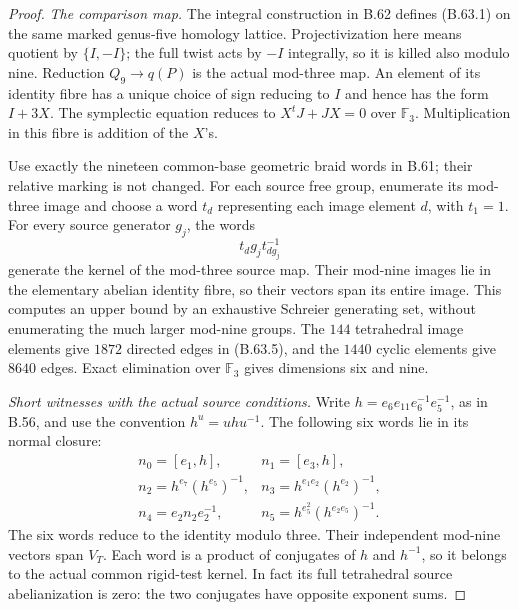 \begin{proof}
\emph{The comparison map.}
The integral construction in B.62 defines (B.63.1) on the
same marked genus-five homology lattice.
Projectivization here means quotient by $\{I,-I\}$;
the full twist acts by $-I$ integrally, so it is killed
also modulo nine.
Reduction $Q_9\to q(P)$ is the actual mod-three map.
An element of its identity fibre has a unique choice of
sign reducing to $I$ and hence has the form $I+3X$.
The symplectic equation reduces to
$X^tJ+JX=0$ over $\mathbb F_3$.
Multiplication in this fibre is addition of the $X$'s.

Use exactly the nineteen common-base geometric braid
words in B.61; their relative marking is not changed.
For each source free group, enumerate its mod-three
image and choose a word $t_d$ representing each image
element $d$, with $t_1=1$.
For every source generator $g_j$, the words
\[
                    t_d g_j t_{dg_j}^{-1}                  \tag{B.63.5}
\]
generate the kernel of the mod-three source map.
Their mod-nine images lie in the elementary abelian
identity fibre, so their vectors span its entire image.
This computes an upper bound by an exhaustive Schreier
generating set, without enumerating the much larger
mod-nine groups.
The $144$ tetrahedral image elements give $1872$ directed
edges in (B.63.5), and the $1440$ cyclic elements give
$8640$ edges.  Exact elimination over $\mathbb F_3$
gives dimensions six and nine.

\emph{Short witnesses with the actual source conditions.}
Write $h=e_6e_{11}e_6^{-1}e_5^{-1}$, as in B.56, and
use the convention $h^u=uhu^{-1}$.
The following six words lie in its normal closure:
\[
\begin{array}{ll}
 n_0=[e_1,h],& n_1=[e_3,h],\\
 n_2=h^{e_7}(h^{e_5})^{-1},&
 n_3=h^{e_1e_2}(h^{e_2})^{-1},\\
 n_4=e_2n_2e_2^{-1},&
 n_5=h^{e_5^2}(h^{e_2e_5})^{-1}.
\end{array}                                                 \tag{B.63.6}
\]
The six words reduce to the identity modulo three.
Their independent mod-nine vectors span $V_T$.
Each word is a product of conjugates of $h$ and $h^{-1}$,
so it belongs to the actual common rigid-test kernel.
In fact its full tetrahedral source abelianization is zero:
the two conjugates have opposite exponent sums.


\end{proof}

